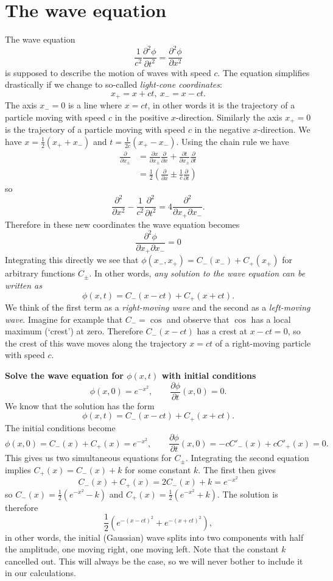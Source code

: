 \section{The wave equation}

The wave equation
\[\frac{1}{c^2}\frac{\partial^2\phi}{\partial t^2}=\frac{\partial^2\phi}{\partial x^2}\]
is supposed to describe the motion of waves with speed $c$. The equation simplifies drastically if we change to so-called {\em light-cone coordinates}:
\[x_+=x+ct,\ x_-=x-ct.\]
The axis $x_-=0$ is a line where $x=ct$, in other words it is the trajectory of a particle moving with speed $c$ in the positive $x$-direction. Similarly the axis $x_+=0$ is the trajectory of a particle moving with speed $c$ in the negative $x$-direction. We have $x=\tfrac{1}{2}(x_++x_-)$ and $t=\tfrac{1}{2c}(x_+-x_-)$. Using the chain rule we have
\begin{align*}
\frac{\partial}{\partial x_{\pm}}&=\frac{\partial x}{\partial x_{\pm}}\frac{\partial}{\partial x}+\frac{\partial t}{\partial x_{\pm}}\frac{\partial}{\partial t}\\
&=\frac{1}{2}\left(\frac{\partial}{\partial x}\pm\frac{1}{c}\frac{\partial}{\partial t}\right)
\end{align*}
so
\[\frac{\partial^2}{\partial x^2}-\frac{1}{c^2}\frac{\partial^2}{\partial t^2}=4\frac{\partial^2}{\partial x_+\partial x_-}.\]
Therefore in these new coordinates the wave equation becomes
\[\frac{\partial^2\phi}{\partial x_+\partial x_-}=0\]
Integrating this directly we see that $\phi(x_-,x_+)=C_-(x_-)+C_+(x_+)$ for arbitrary functions $C_{\pm}$. In other words, {\em any solution to the wave equation can be written as}
\[\phi(x,t)=C_-(x-ct)+C_+(x+ct).\]
We think of the first term as a {\em right-moving wave} and the second as a {\em left-moving wave}. Imagine for example that $C_-=\cos$ and observe that $\cos$ has a local maximum (`crest') at zero. Therefore $C_-(x-ct)$ has a crest at $x-ct=0$, so the crest of this wave moves along the trajectory $x=ct$ of a right-moving particle with speed $c$.

\begin{exm}
{\bf Solve the wave equation for $\phi(x,t)$ with initial conditions}
\[\phi(x,0)=e^{-x^2},\qquad\frac{\partial\phi}{\partial t}(x,0)=0.\]
We know that the solution has the form
\[\phi(x,t)=C_-(x-ct)+C_+(x+ct).\]
The initial conditions become
\[\phi(x,0)=C_-(x)+C_+(x)=e^{-x^2},\qquad\frac{\partial\phi}{\partial t}(x,0)=-cC'_-(x)+cC'_+(x)=0.\]
This gives us two simultaneous equations for $C_{\pm}$. Integrating the second equation implies $C_+(x)=C_-(x)+k$ for some constant $k$. The first then gives
\[C_-(x)+C_+(x)=2C_-(x)+k=e^{-x^2}\]
so $C_-(x)=\frac{1}{2}\left(e^{-x^2}-k\right)$ and $C_+(x)=\frac{1}{2}\left(e^{-x^2}+k\right)$. The solution is therefore
\[\frac{1}{2}\left(e^{-(x-ct)^2}+e^{-(x+ct)^2}\right),\]
in other words, the initial (Gaussian) wave splits into two components with half the amplitude, one moving right, one moving left. Note that the constant $k$ cancelled out. This will always be the case, so we will never bother to include it in our calculations.
\end{exm}

